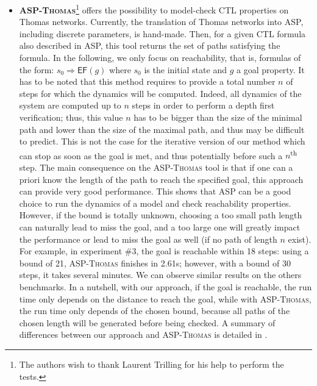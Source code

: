 \begin{itemize}[leftmargin=*]
\item \textbf{\textsc{ASP-Thomas}}\footnote{The authors wish to thank Laurent Trilling for his help to perform the tests.}
offers the possibility to model-check CTL properties on Thomas networks.
Currently, the translation of Thomas networks into ASP, including discrete parameters, is hand-made.
Then, for a given CTL formula also described in ASP, this tool returns the set of paths satisfying the formula.
In the following, we only focus on reachability, that is, formulas of the form: $s_0 \Rightarrow \mathsf{EF}(g)$
where $s_0$ is the initial state and $g$ a goal property.
It has to be noted that this method requires to provide a total number $n$ of steps
for which the dynamics will be computed.
Indeed, all dynamics of the system are computed up to $n$ steps in order to perform a depth first verification;
thus, this value $n$ has to be bigger than the size of the minimal path and lower than the size of the maximal path,
and thus may be difficult to predict.
This is not the case for the iterative version of our method which can stop as soon as the goal is met,
and thus potentially before such a $n$\textsuperscript{th} step.
The main consequence on the \textsc{ASP-Thomas} tool
is that if one can a priori know the length of the path to reach the specified goal,
this approach can provide very good performance.
This shows that ASP can be a good choice to run the dynamics of a model and check reachability properties.
However, if the bound is totally unknown, choosing a too small path length can naturally lead to miss the goal,
and a too large one will greatly impact the performance or lead to miss the goal as well (if no path of length $n$ exist).
For example, in experiment \#3, the goal is reachable within 18 steps:
using a bound of 21, \textsc{ASP-Thomas} finishes in 2.61s;
however, with a bound of 30 steps, it takes several minutes.
We can observe similar results on the others benchmarks.
In a nutshell, with our approach, if the goal is reachable, the run time only depends on the distance to reach the goal,
while with \textsc{ASP-Thomas}, the run time only depends of the chosen bound,
because all paths of the chosen length will be generated before being checked.
A summary of differences between our approach and \textsc{ASP-Thomas} is detailed in .

\end{itemize}
